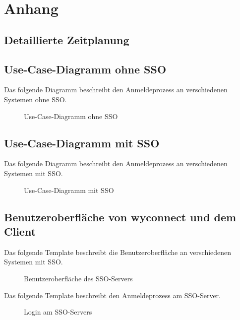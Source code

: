 \section{Anhang}
\subsection{Detaillierte Zeitplanung}
\label{app:Zeitplanung}





\clearpage

\subsection{Use-Case-Diagramm ohne SSO}
\label{app:Use-Case-Diagramm}
Das folgende Diagramm beschreibt den Anmeldeprozess an verschiedenen Systemen ohne \acs{SSO}.
\begin{figure}[htb]
\centering
{}
\caption{Use-Case-Diagramm ohne SSO}
\end{figure}
\clearpage

\subsection{Use-Case-Diagramm mit SSO}
\label{app:Use-Case-Diagramm2}
Das folgende Diagramm beschreibt den Anmeldeprozess an verschiedenen Systemen mit \acs{SSO}.
\begin{figure}[htb]
\centering
{}
\caption{Use-Case-Diagramm mit SSO}
\end{figure}
\clearpage

\subsection{Benutzeroberfläche von wyconnect und dem Client}
\label{app:wyconnect-mockup}

Das folgende Template beschreibt die Benutzeroberfläche an verschiedenen Systemen mit \acs{SSO}.
\begin{figure}[htb]
\centering
{}
\caption{Benutzeroberfläche des SSO-Servers}
\end{figure}
\clearpage

Das folgende Template beschreibt den Anmeldeprozess am \acs{SSO}-Server.
\begin{figure}[htb]
\centering
{}
\caption{Login am SSO-Servers}
\end{figure}
\clearpage


